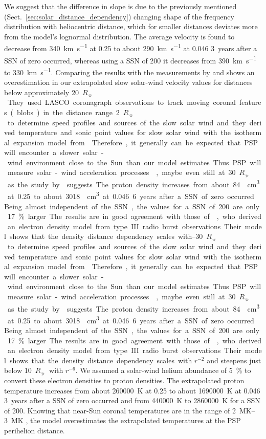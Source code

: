 \documentclass[]{aa}
\newcommand{\Rs}{$R_\sun{}$}
\begin{document}
        We suggest that the difference in slope is due to the previously mentioned (Sect.~\ref{sec:solar_distance_dependency}) changing shape of the frequency distribution with heliocentric distance, which for smaller distances deviates more from the model’s lognormal distribution.
        The average velocity is found to decrease from \SI{340}{\km\per\s} at \SI{0.25}{\au} to about \SI{290}{\km\per\s} at \SI{0.046}{\au} 3~years after a SSN of zero occurred, whereas using a SSN of 200 it decreases from \SI{390}{\km\per\s} to \SI{330}{\km\per\s}. Comparing the results with the measurements by \citet{Sheeley1997} and \citet{Wang2000} shows an overestimation in our extrapolated slow solar-wind velocity values for distances below approximately \SI{20}{\Rs}. They used LASCO coronagraph observations to track moving coronal features (blobs) in the distance range \SIrange{2}{30}{\Rs} to determine speed profiles and sources of the slow solar wind and they derived temperature and sonic point values for slow solar wind with the isothermal expansion model from \citet{Parker1958}. Therefore, it generally can be expected that PSP will encounter a slower solar-wind environment close to the Sun than our model estimates. Thus PSP will measure solar-wind acceleration processes \citep{McComas2008}, maybe even still at \SI{30}{\Rs} as the study by \citet{Sheeley1997} suggests.
        The proton density increases from about \SI{84}{\per\cm\cubed} at \SI{0.25}{\au} to about \SI{3018}{\per\cm\cubed} at \SI{0.046}{\au} 6~years after a SSN of zero occurred. Being almost independent of the SSN, the values for a SSN of 200 are only \SI{17}{\%} larger. The results are in good agreement with those of \citet{Leblanc1998}, who derived an electron density model from type~III radio burst observations. Their model shows that the density distance dependency scales with $r^{-2}$ and steepens just below \SI{10}{\Rs} with $r^{-6}$. We assumed a solar-wind helium abundance of \SI{5}{\%} to convert these electron densities to proton densities.
        The extrapolated proton temperature increases from about \SI{260000}{\K} at \SI{0.25}{\au} to about \SI{1690000}{\K} at \SI{0.046}{\au} 3~years after a SSN of zero occurred and from \SI{440000}{\K} to \SI{2860000}{\K} for a SSN of 200. Knowing that near-Sun coronal temperatures are in the range of \SIrange{2}{3}{\mega\K} \citep{Billings1959,Liebenberg1975}, the model overestimates the extrapolated temperatures at the PSP perihelion distance.
\end{document}
